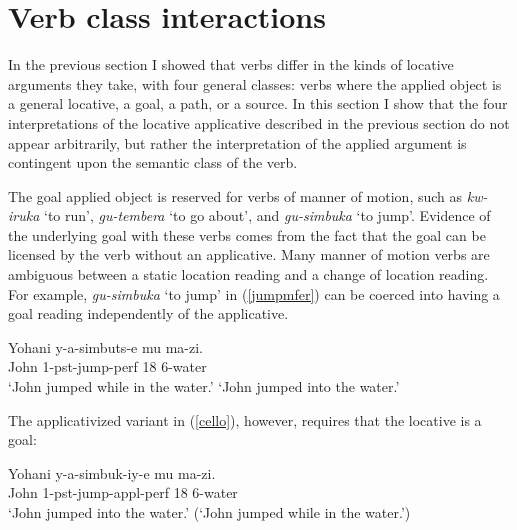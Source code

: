 \documentclass[output=paper]{langsci/langscibook}
\begin{document}
\section{Verb class interactions} %
In the previous section I showed that verbs differ in the kinds of locative arguments they take, with four general classes: verbs where the applied object is a general {\sc locative}, a {\sc goal}, a {\sc path}, or a {\sc source}.  In this section I show that the four interpretations of the locative applicative described in the previous section do not appear arbitrarily, but rather the interpretation of the applied argument is contingent upon the semantic class of the verb. 

 
 The {\sc goal} applied object is reserved for verbs of manner of motion, such as \emph{kw-iruka} `to run', \emph{gu-tembera} `to go about', and \emph{gu-simbuka} `to jump'. Evidence of the underlying {\sc goal}  with these verbs comes from the fact that the {\sc goal} can be licensed by the verb without an applicative.
		\iffalse
		\begin{exe}
			\ex\gll Yohani y-iruts-e i-ruhanda.\\
					John 	{\sc 1-}run-{\sc perf} 5-road\\
					\glt `John ran on the road.'
			\end{exe}
			\fi %
		 Many manner of motion verbs are ambiguous between a static location reading and a change of location reading. For example, \emph{gu-simbuka} `to jump' in (\ref{jumpmfer}) can be coerced into having a {\sc goal}  reading independently of the applicative.		
		\begin{exe}
			\ex\label{jumpmfer}\gll Yohani y-a-simbuts-e mu ma-zi.\\
				John 	1-{\sc pst-}jump-{\sc perf} 18 6-water\\
				\glt `John jumped while in the water.'
				\glt `John jumped into the water.'
		\end{exe}
%
 The applicativized variant in (\ref{cello}), however, requires that the locative is a {\sc goal}:
			\begin{exe}
			\ex\label{cello} \gll Yohani y-a-simbuk-iy-e mu ma-zi.\\
				John 1-{\sc pst}-jump-{\sc appl-perf} 18 6-water\\
				\glt `John jumped into the water.'
				\glt \bad (`John jumped while in the water.')
			\end{exe}
\end{document}
